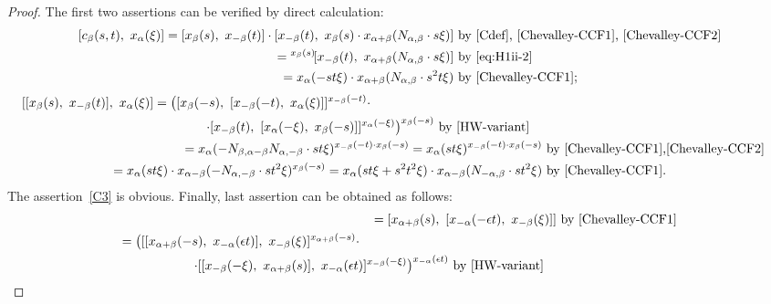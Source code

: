 \documentclass[oneside, 8pt]{amsart}
\theoremstyle{remark}
\theoremstyle{definition}
\numberwithin{lemma}{section}
\numberwithin{prop}{section}
\numberwithin{corollary}{section}
\numberwithin{externaltheorem}{section}
\numberwithin{equation}{section}
\begin{document}
\begin{proof}
The first two assertions can be verified by direct calculation:
\begin{align*} \nonumber [c_{\beta}(s, t),\ x_{\alpha}(\xi)] = [x_{\beta}(s),\ x_{-\beta}(t)] \cdot [x_{-\beta}(t),\ x_{\beta}(s)\cdot x_{\alpha + \beta}(N_{\alpha, \beta} \cdot s\xi)] &\text{ by~\eqref{Cdef}, \eqref{Chevalley-CCF1}, \eqref{Chevalley-CCF2}} \\
 = {}^{x_\beta(s)}\![x_{-\beta}(t),\ x_{\alpha+\beta}(N_{\alpha, \beta} \cdot s\xi)] &\text{ by~\eqref{eq:H1ii-2}} \\ = x_{\alpha}(- st\xi) \cdot x_{\alpha+\beta}(N_{\alpha,\beta} \cdot s^2t\xi) &\text{ by~\eqref{Chevalley-CCF1};} \end{align*}
\begin{align*} \nonumber
\begin{split}[[x_\beta(s),\ x_{-\beta}(t)],\ x_{\alpha}(\xi)] = \bigl([x_\beta(-s),\ [x_{-\beta}(-t),\ x_{\alpha}(\xi)]] ^ {x_{-\beta}(-t)} \cdot \hspace{50pt} \\ \cdot [x_{-\beta}(t),\ [ x_{\alpha}(-\xi),\ x_\beta(-s)]] ^ {x_{\alpha}(-\xi)}\bigr)^{x_\beta(-s)} & \text{ by~\eqref{HW-variant}}\end{split} \\
= x_{\alpha}(-N_{\beta, \alpha-\beta} N_{\alpha,-\beta} \cdot s t \xi) ^ {x_{-\beta}(-t) \cdot x_\beta(-s)} = x_{\alpha}(s t \xi) ^ {x_{-\beta}(-t) \cdot x_\beta(-s)} & \text{ by~\eqref{Chevalley-CCF1},\eqref{Chevalley-CCF2}}\\
= x_{\alpha}(st\xi) \cdot x_{\alpha-\beta}(-N_{\alpha,-\beta}\cdot st^2\xi)^{x_\beta(-s)} = x_{\alpha}(st\xi + s^2t^2 \xi) \cdot x_{\alpha-\beta}(N_{-\alpha,\beta}\cdot st^2\xi) & \text{ by~\eqref{Chevalley-CCF1}.} \end{align*}
The assertion~\eqref{C3} is obvious. Finally, last assertion can be obtained as follows:
\begin{align*}
[x_{\alpha+\beta}(s),\ x_{-\alpha-\beta}(t\xi)] = [x_{\alpha+\beta}(s),\ [x_{-\alpha}(-\epsilon t),\ x_{-\beta}(\xi)]]&\ \text{by~\eqref{Chevalley-CCF1}}\\
\begin{split}
    =\bigl( [[x_{\alpha+\beta}(-s),\ x_{-\alpha}(\epsilon t)],\ x_{-\beta}(\xi)] ^ {x_{\alpha+\beta}(-s)} \cdot \hspace{70pt} \\
        \cdot [[ x_{-\beta}(-\xi),\ x_{\alpha+\beta}(s)],\ x_{-\alpha}(\epsilon t)]^{x_{-\beta}(-\xi)}\bigr)^{x_{-\alpha}(\epsilon t)} &\ \text{by~\eqref{HW-variant}}

\end{split}
\end{align*}
\end{proof}
\end{document}
